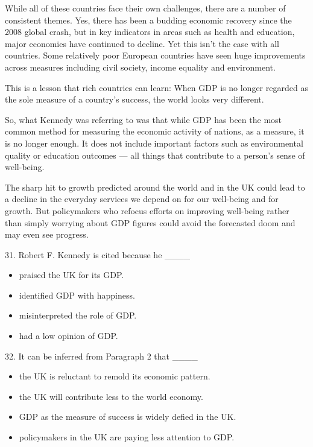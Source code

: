 \documentclass[UTF8,11pt]{ctexart}
\begin{document}
While all of these countries face their own challenges, there are a number of consistent themes. Yes, there has been a budding economic recovery since the 2008 global crash, but in key indicators in areas such as health and education, major economies have continued to decline. Yet this isn’t the case with all countries. Some relatively poor European countries have seen huge improvements across measures including civil society, income equality and environment.


This is a lesson that rich countries can learn: When GDP is no longer regarded as the sole measure of a country’s success, the world looks very different.


So, what Kennedy was referring to was that while GDP has been the most common method for measuring the economic activity of nations, as a measure, it is no longer enough. It does not include important factors such as environmental quality or education outcomes — all things that contribute to a person’s sense of well-being.


The sharp hit to growth predicted around the world and in the UK could lead to a decline in the everyday services we depend on for our well-being and for growth. But policymakers who refocus efforts on improving well-being rather than simply worrying about GDP figures could avoid the forecasted doom and may even see progress.


31. Robert F. Kennedy is cited because he \_\_\_\_


\begin{itemize}[leftmargin=2em,itemsep=.2em,topsep=.4em]\item[A.] praised the UK for its GDP.
\item[B.] identified GDP with happiness.
\item[C.] misinterpreted the role of GDP.
\item[D.] had a low opinion of GDP.
\end{itemize}

32. It can be inferred from Paragraph 2 that \_\_\_\_


\begin{itemize}[leftmargin=2em,itemsep=.2em,topsep=.4em]\item[A.] the UK is reluctant to remold its economic pattern.
\item[B.] the UK will contribute less to the world economy.
\item[C.] GDP as the measure of success is widely defied in the UK.
\item[D.] policymakers in the UK are paying less attention to GDP.
\end{itemize}
\end{document}
